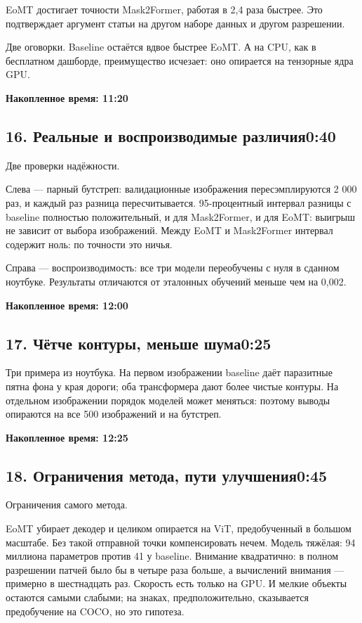 \documentclass[11pt,a4paper]{article}
\newcommand{\cumul}[1]{\par{\hfill\small\color{accent}\bfseries #1}\par}
\newcommand{\tempo}[1]{\hfill{\normalsize\color{accent}#1}}
\begin{document}
EoMT достигает точности Mask2Former, работая в 2,4 раза быстрее. Это подтверждает аргумент статьи на другом наборе данных и другом разрешении.

Две оговорки. Baseline остаётся вдвое быстрее EoMT. А на CPU, как в бесплатном дашборде, преимущество исчезает: оно опирается на тензорные ядра GPU.

\cumul{Накопленное время: 11:20}

\subsection*{16. Реальные и воспроизводимые различия\tempo{0:40}}

Две проверки надёжности.

Слева — парный бутстреп: валидационные изображения пересэмплируются 2 000 раз, и каждый раз разница пересчитывается. 95-процентный интервал разницы с baseline полностью положительный, и для Mask2Former, и для EoMT: выигрыш не зависит от выбора изображений. Между EoMT и Mask2Former интервал содержит ноль: по точности это ничья.

Справа — воспроизводимость: все три модели переобучены с нуля в сданном ноутбуке. Результаты отличаются от эталонных обучений меньше чем на 0,002.

\cumul{Накопленное время: 12:00}

\subsection*{17. Чётче контуры, меньше шума\tempo{0:25}}

Три примера из ноутбука. На первом изображении baseline даёт паразитные пятна фона у края дороги; оба трансформера дают более чистые контуры. На отдельном изображении порядок моделей может меняться: поэтому выводы опираются на все 500 изображений и на бутстреп.

\cumul{Накопленное время: 12:25}

\subsection*{18. Ограничения метода, пути улучшения\tempo{0:45}}

Ограничения самого метода.

EoMT убирает декодер и целиком опирается на ViT, предобученный в большом масштабе. Без такой отправной точки компенсировать нечем. Модель тяжёлая: 94 миллиона параметров против 41 у baseline. Внимание квадратично: в полном разрешении патчей было бы в четыре раза больше, а вычислений внимания — примерно в шестнадцать раз. Скорость есть только на GPU. И мелкие объекты остаются самыми слабыми; на знаках, предположительно, сказывается предобучение на COCO, но это гипотеза.
\end{document}
